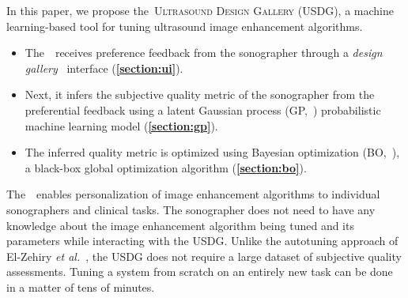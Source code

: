 In this paper, we propose the~\textsc{Ultrasound Design Gallery} (USDG), a machine learning-based tool for tuning ultrasound image enhancement algorithms.
\begin{itemize}
    \item[\ding{228}] The~\usdg~receives preference feedback from the sonographer through a \textit{design gallery}~\cite{brochu_bayesian_2010, 10.1145/3072959.3073598, koyama_sequential_2020, phan_color_2018, pmlr-v119-mikkola20a} interface (\textbf{\cref{section:ui}}).
    \vspace{0.02in}
  \item[\ding{228}] Next, it infers the subjective quality metric of the sonographer from the preferential feedback using a latent Gaussian process (GP,~\cite{rasmussen_gaussian_2006, pmlr-v119-mikkola20a}) probabilistic machine learning model (\textbf{\cref{section:gp}}).
    \vspace{0.02in}
  \item[\ding{228}] The inferred quality metric is optimized using Bayesian optimization (BO,~\cite{shahriari_taking_2016}), a black-box global optimization algorithm (\textbf{\cref{section:bo}}).
\end{itemize}
The~\usdg~enables personalization of image enhancement algorithms to individual sonographers and clinical tasks.
The sonographer does not need to have any knowledge about the image enhancement algorithm being tuned and its parameters while interacting with the USDG.
Unlike the autotuning approach of El-Zehiry \textit{et al.}~\cite{el-zehiry_learning_2013}, the USDG does not require a large dataset of subjective quality assessments.
Tuning a system from scratch on an entirely new task can be done in a matter of tens of minutes.


